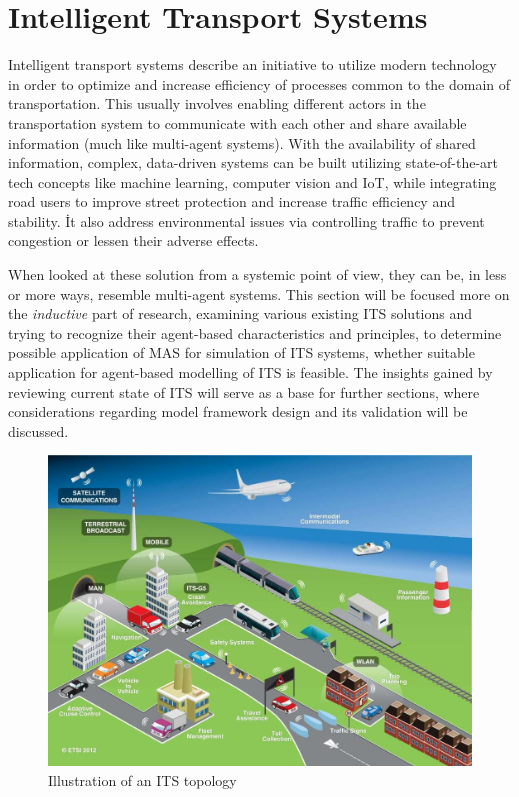 \documentclass[main.tex]{subfiles}
\begin{document}
\section{Intelligent Transport Systems}\label{sec-its}

Intelligent transport systems describe an initiative to utilize modern technology 
in order to optimize and increase efficiency of processes common to the domain of transportation. 
This usually involves enabling different actors in the transportation system to communicate 
with each other and share available information (much like multi-agent systems). With the 
availability of shared information, complex, data-driven systems can be built utilizing 
state-of-the-art tech concepts like machine learning, computer vision and IoT, while
integrating road users to improve street protection and increase traffic efficiency and stability.
İt also address environmental issues via controlling traffic to prevent congestion or lessen
their adverse effects. 

When looked at these solution from a systemic point of view, they can 
be, in less or more ways, resemble multi-agent systems. This section will be focused more on 
the \emph{inductive} part of research, examining various existing ITS solutions and trying 
to recognize their agent-based characteristics and principles, to determine possible application 
of MAS for simulation of ITS systems, whether suitable application for agent-based modelling of 
ITS is feasible. The insights gained by reviewing current state of ITS will 
serve as a base for further sections, where considerations regarding model framework design and 
its validation will be discussed. 

\begin{figure}[htbp]
    \centering
    \includegraphics[width=.8\textwidth]{ITS-schema.jpg}
    \caption{Illustration of an ITS topology \cite{ETSI}}
    \label{its-map}
\end{figure}
\end{document}
